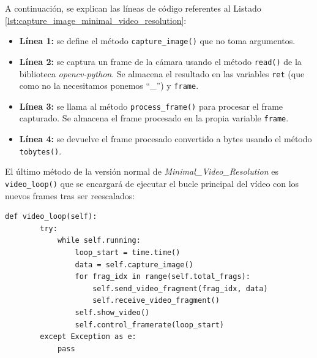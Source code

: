 A continuación, se explican las líneas de código referentes al Listado \ref{lst:capture_image_minimal_video_resolution}:
\begin{itemize}
    \item \textbf{Línea 1:} se define el método \texttt{capture\_image()} que no toma argumentos.
    \item \textbf{Línea 2:} se captura un frame de la cámara usando el método \texttt{read()} de la biblioteca \textit{opencv-python}. Se almacena el resultado en las variables \texttt{ret} (que como no la necesitamos ponemos ``\_'') y \texttt{frame}.
    \item \textbf{Línea 3:} se llama al método \texttt{process\_frame()} para procesar el frame capturado. Se almacena el frame procesado en la propia variable \texttt{frame}.
    \item \textbf{Línea 4:} se devuelve el frame procesado convertido a bytes usando el método \texttt{tobytes()}.
\end{itemize}
\vspace{\baselineskip}

El último método de la versión normal de \textit{Minimal\_Video\_Resolution} es \texttt{video\_loop()} que se encargará de ejecutar el bucle principal del vídeo con los nuevos frames tras ser reescalados:
\begin{lstlisting}[style=pythonstyle, caption={Método \texttt{video\_loop()} de \textit{Minimal\_Video\_Resolution}.}, label={lst:video_loop_minimal_video_resolution}]
def video_loop(self):
        try:
            while self.running:
                loop_start = time.time()
                data = self.capture_image()
                for frag_idx in range(self.total_frags):
                    self.send_video_fragment(frag_idx, data)
                    self.receive_video_fragment()
                self.show_video()
                self.control_framerate(loop_start)
        except Exception as e:
            pass
\end{lstlisting}
\vspace{\baselineskip}

